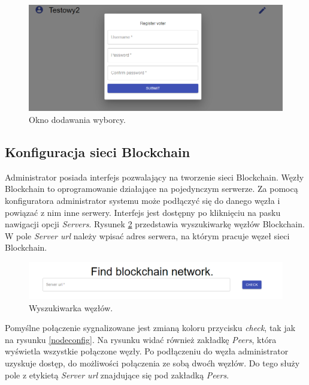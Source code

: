 \documentclass[a4paper,12pt]{book}
\begin{document}
\begin{figure}[h]
	\centering
	\includegraphics[width=\textwidth]{images/addvoter.png}
	\caption{Okno dodawania wyborcy.}\label{addvoter}
\end {figure}

\newpage

\subsection{Konfiguracja sieci Blockchain}

Administrator posiada interfejs pozwalający na tworzenie sieci Blockchain. Węzły Blockchain to oprogramowanie działające na pojedynczym serwerze. Za pomocą konfiguratora administrator systemu może podłączyć się do danego węzła i powiązać z nim inne serwery. Interfejs jest dostępny po kliknięciu na pasku nawigacji opcji \textit{Servers}. Rysunek \ref{findnode} przedstawia wyszukiwarkę węzłów Blockchain. W pole \textit{Server url} należy wpisać adres serwera, na którym pracuje węzeł sieci Blockchain.

\begin{figure}[h]
	\centering
	\includegraphics[width=\textwidth]{images/findnode.png}
	\caption{Wyszukiwarka węzłów.}\label{findnode}
\end {figure}

Pomyślne połączenie sygnalizowane jest zmianą koloru przycisku \textit{check}, tak jak na rysunku \ref{nodeconfig}. Na rysunku widać również zakładkę \textit{Peers}, która wyświetla wszystkie połączone węzły. Po podłączeniu do węzła administrator uzyskuje dostęp, do możliwości połączenia ze sobą dwoćh węzłów. Do tego służy pole z etykietą \textit{Server url} znajdujące się pod zakładką \textit{Peers}.
\end{document}
